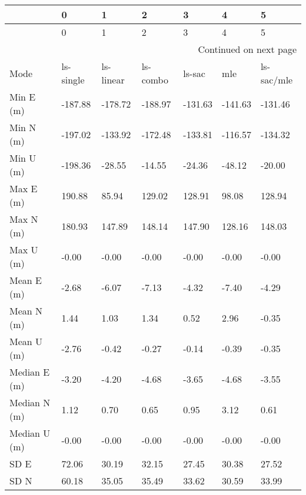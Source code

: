 \begin{longtable}{lllllll}
\toprule
{} &          0 &          1 &         2 &        3 &        4 &           5 \\
\midrule
\endfirsthead

\toprule
{} &          0 &          1 &         2 &        3 &        4 &           5 \\
\midrule
\endhead
\midrule
\multicolumn{7}{r}{{Continued on next page}} \\
\midrule
\endfoot

\bottomrule
\endlastfoot
Mode              &  ls-single &  ls-linear &  ls-combo &   ls-sac &      mle &  ls-sac/mle \\
Min E (m)         &    -187.88 &    -178.72 &   -188.97 &  -131.63 &  -141.63 &     -131.46 \\
Min N (m)         &    -197.02 &    -133.92 &   -172.48 &  -133.81 &  -116.57 &     -134.32 \\
Min U (m)         &    -198.36 &     -28.55 &    -14.55 &   -24.36 &   -48.12 &      -20.00 \\
Max E (m)         &     190.88 &      85.94 &    129.02 &   128.91 &    98.08 &      128.94 \\
Max N (m)         &     180.93 &     147.89 &    148.14 &   147.90 &   128.16 &      148.03 \\
Max U (m)         &      -0.00 &      -0.00 &     -0.00 &    -0.00 &    -0.00 &       -0.00 \\
Mean E (m)        &      -2.68 &      -6.07 &     -7.13 &    -4.32 &    -7.40 &       -4.29 \\
Mean N (m)        &       1.44 &       1.03 &      1.34 &     0.52 &     2.96 &       -0.35 \\
Mean U (m)        &      -2.76 &      -0.42 &     -0.27 &    -0.14 &    -0.39 &       -0.35 \\
Median E (m)      &      -3.20 &      -4.20 &     -4.68 &    -3.65 &    -4.68 &       -3.55 \\
Median N (m)      &       1.12 &       0.70 &      0.65 &     0.95 &     3.12 &        0.61 \\
Median U (m)      &      -0.00 &      -0.00 &     -0.00 &    -0.00 &    -0.00 &       -0.00 \\
SD E              &      72.06 &      30.19 &     32.15 &    27.45 &    30.38 &       27.52 \\
SD N              &      60.18 &      35.05 &     35.49 &    33.62 &    30.59 &       33.99 \\

\end{longtable}

